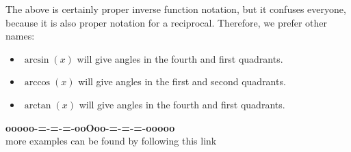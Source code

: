 \documentclass{ximera}
\begin{document}
The above is certainly proper inverse function notation, but it confuses everyone, because it is also proper notation for a reciprocal.  Therefore, we prefer other names:




\begin{itemize}
\item \textbf{\textcolor{blue!55!black}{$\arcsin(x)$}}  will give angles in the fourth and first quadrants.
\item \textbf{\textcolor{blue!55!black}{$\arccos(x)$}}  will give angles in the first and second quadrants.
\item \textbf{\textcolor{blue!55!black}{$\arctan(x)$}}  will give angles in the fourth and first quadrants.
\end{itemize}





\begin{center}
\textbf{\textcolor{green!50!black}{ooooo-=-=-=-ooOoo-=-=-=-ooooo}} \\

more examples can be found by following this link\\ 

\end{center}
\end{document}
